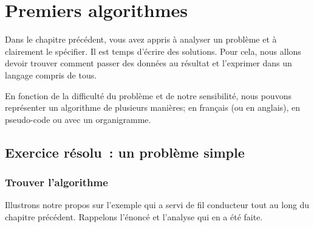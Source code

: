 \chapter{Premiers algorithmes}
\label{premalgos}

	Dans le chapitre précédent, vous avez appris à analyser un problème et
	à clairement le spécifier.  Il est temps d’écrire des solutions.  Pour cela,
	nous allons devoir trouver comment passer des données au résultat et
	l’exprimer dans un langage compris de tous.
	
	En fonction de la difficulté du problème et de notre sensibilité, nous
	pouvons représenter un algorithme de plusieurs manières; en français (ou en
	anglais), en pseudo-code ou avec un organigramme. 

	\newpage
	\minitoc
	\newpage
	
	\section{Exercice résolu~: un problème simple}
	
		\subsection{Trouver l’algorithme}

			Illustrons notre propos sur l’exemple qui a servi de fil conducteur
			tout au long du chapitre précédent.  Rappelons l’énoncé et l’analyse
			qui en a été faite.
			
